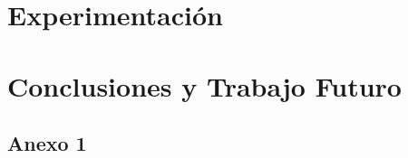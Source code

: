 \documentclass{prgrado}
\begin{document}
\chapter{Experimentación}


\chapter{Conclusiones y Trabajo Futuro}



\backmatter

\newpage




\begin{appendix}
\chapter{Anexo 1}

\end{appendix}
\end{document}
